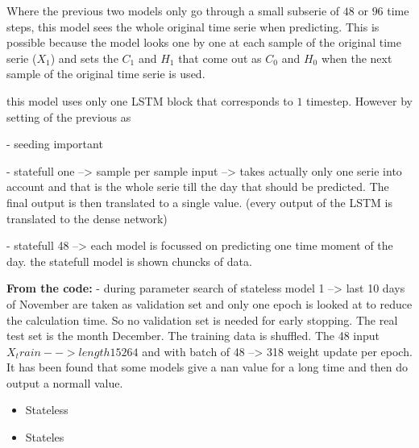 Where the previous two models only go through a small subserie of $ 48 $ or $ 96 $ time steps, this model sees the whole original time serie when predicting. This is possible because the model looks one by one at each sample of the original time serie ($ X_{1} $) and sets the $ C_{1} $ and $ H_{1} $ that come out as $ C_{0} $ and $ H_{0} $ when the next sample of the original time serie is used. 




this model uses only one LSTM block that corresponds to $ 1 $ timestep. However by setting  of the previous  as 

- seeding important

- statefull one --> sample per sample input --> takes actually only one serie into account and that is the whole serie till the day that should be predicted. The final output is then translated to a single value. (every output of the LSTM is translated to the dense network)

- statefull 48 --> each model is focussed on predicting one time moment of the day. the statefull model is shown chuncks of data. 

\textbf{From the code:}
- during parameter search of stateless model 1 --> last 10 days of November are taken as validation set and only one epoch is looked at to reduce the calculation time. So no validation set is needed for early stopping. The real test set is the month December. The training data is shuffled. 
The 48 input $X_train --> length 15264$ and with batch of 48 --> 318 weight update per epoch.
It has been found that some models give a nan value for a long time and then do output a normall value. 


\begin{itemize}
	\item Stateless
	\item Stateles
\end{itemize}

%


